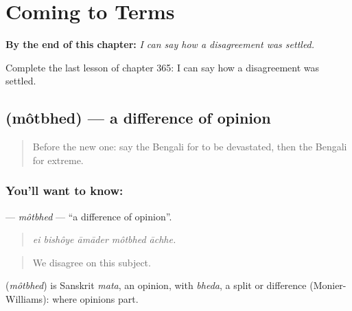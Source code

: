 
\chapter{Coming to Terms}
\label{ch:bn-coming-to-terms}

\begin{chapteropening}
\textbf{By the end of this chapter:} \emph{I can say how a disagreement was settled.}

Complete the last lesson of chapter 365: I can say how a disagreement was settled.
\end{chapteropening}

\section[\texorpdfstring{\bn{মতভেদ} (môtbhed)}{মতভেদ (môtbhed)}]{ (môtbhed) — a difference of opinion}

\label{lesson:BN-C365-motbhed}



\begin{quote}
Before the new one: say the Bengali for to be devastated, then the Bengali for extreme.
\end{quote}

\subsection*{You'll want to know: }
\textbf{} — \emph{môtbhed} — \textquotedblleft{}a difference of opinion\textquotedblright{}.

\begin{quote}
    
\end{quote}

\begin{quote}
\emph{ei bishôye āmāder môtbhed āchhe.}
\end{quote}

\begin{quote}
We disagree on this subject.
\end{quote}

\begin{cousinweb}
\textbf{} (\emph{môtbhed}) is Sanskrit \emph{mata}, an opinion, with \emph{bheda}, a split or difference (Monier-Williams): where opinions part.
\end{cousinweb}

